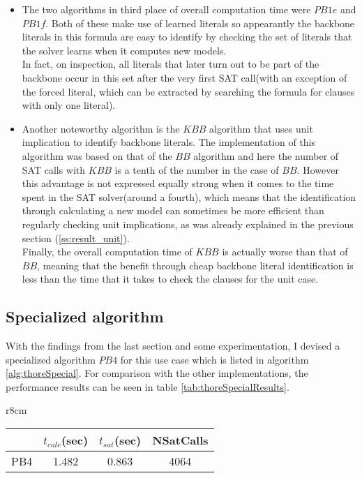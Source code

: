 \begin{itemize}
\item The two algorithms in third place of overall computation time were $PB1e$ and $PB1f$. Both of these make use of learned literals so appearantly the backbone literals in this formula are easy to identify by checking the set of literals that the solver learns when it computes new models.\\
In fact, on inspection, all literals that later turn out to be part of the backbone occur in this set after the very first SAT call(with an exception of the forced literal, which can be extracted by searching the formula for clauses with only one literal).
\item Another noteworthy algorithm is the $KBB$ algorithm that uses unit implication to identify backbone literals. The implementation of this algorithm was based on that of the $BB$ algorithm and here the number of SAT calls with $KBB$ is a tenth of the number in the case of $BB$. However this advantage is not expressed equally strong when it comes to the time spent in the SAT solver(around a fourth), which means that the identification through calculating a new model can sometimes be more efficient than regularly checking unit implications, as was already explained in the previous section (\ref{ss:result_unit}).\\
Finally, the overall computation time of $KBB$ is actually worse than that of $BB$, meaning that the benefit through cheap backbone literal identification is less than the time that it takes to check the clauses for the unit case. 
\end{itemize}

\subsection{Specialized algorithm}

With the findings from the last section and some experimentation, I devised a specialized algorithm $PB4$ for this use case which is listed in algorithm \ref{alg:thoreSpecial}. For comparison with the other implementations, the performance results can be seen in table \ref{tab:thoreSpecialResults}.

\begin{wraptable}[7]{r}{8cm}
\begin{tabular}{l| c c c }
&	$t_{calc}$(sec) &	$t_{sat}$(sec)	& NSatCalls \\
\hline
PB4 & 1.482 & 0.863 & 4064 \\
\end{tabular}
\caption{Results of specialized backbone algorithm on product formula benchmark.}
\label{tab:thoreSpecialResults}
\end{wraptable}

